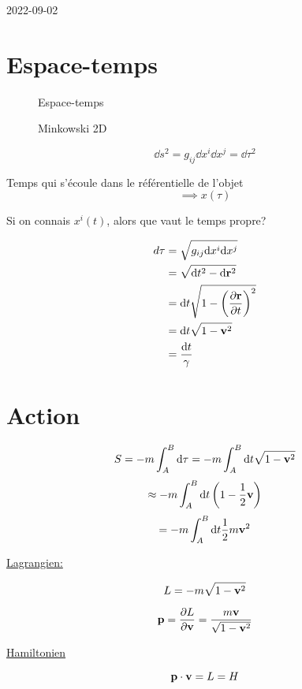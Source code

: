 


2022-09-02

\section*{Espace-temps}

\begin{figure}[H!]
    \centering
    \caption{Espace-temps}
    \label{fig:espace-temps}
\end{figure}


\begin{figure}[H!]
    \centering
    \caption{Minkowski 2D}
    \label{fig:minkowski-2d}
\end{figure}


$$\dd s^{2}= g_{ij} \dd x^{i}\dd x^{j}= \dd \tau^{2}$$ 

\begin{tcolorbox}[title=Temps propre]
	 Temps qui s'écoule dans le référentielle de l'objet $$\implies x(\tau)$$ 
\end{tcolorbox}

Si on connais $x^{i} (t)$, alors que vaut le temps propre?

\begin{align*}
	d\tau &= \sqrt{g_{ij} \dd x^{i}\dd x^{j}}\\
				&= \sqrt{\dd t^{2}- \dd \vb{r}^2 }\\
        &= \dd t \sqrt{1 - \qty(\pdv{\vb{r}}{t})^2}\\
    &= \dd t \sqrt{1 -\vb{v}^2}\\
    &= \frac{\dd t}{\gamma} 
\end{align*} 

\section*{Action}


$$S = -m \int_{A}^{B}\dd \tau = -m \int_{A}^{B}\dd t \sqrt{1 -\vb{v}^2}$$ 
$$\approx -m \int_{A}^{B}\dd t \left( 1- \frac{1}{2} \vb{v} \right) $$ 
$$= -m \int_{A}^{B}\dd t \frac{1}{2} m \vb{v}^2$$ 

\underline{Lagrangien:}

$$L = -m \sqrt{1-\vb{v}^2} $$ 

$$\vb{p} = \pdv{L}{\vb{v}} = \frac{m\vb{v}}{\sqrt{1-\vb{v}^2}} $$ 

\underline{Hamiltonien} 

$$\vb{p}\cdot \vb{v}=L = H$$ 



